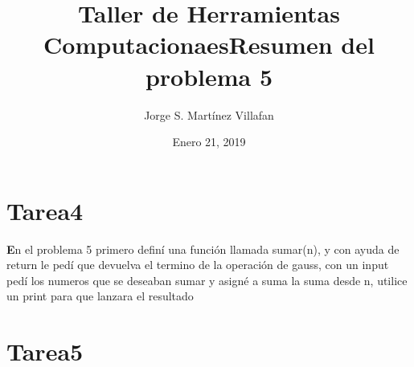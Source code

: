 \documentclass[letterpaper, 12pt, oneside]{article}%
\title{\Huge Taller de Herramientas Computacionaes}
\author{Jorge S. Martínez Villafan}
\date{Enero 21, 2019}
\begin{document}
\maketitle
\newpage
\title{Resumen del problema 5}
\section{Tarea4}
\textbf En el problema 5 primero definí una función llamada sumar(n), y con ayuda de return le pedí que devuelva el termino de la operación de gauss, con un input pedí los numeros que se deseaban sumar y asigné a suma la suma desde n, utilice un print para que lanzara el resultado
\section{Tarea5}
\end{document}
